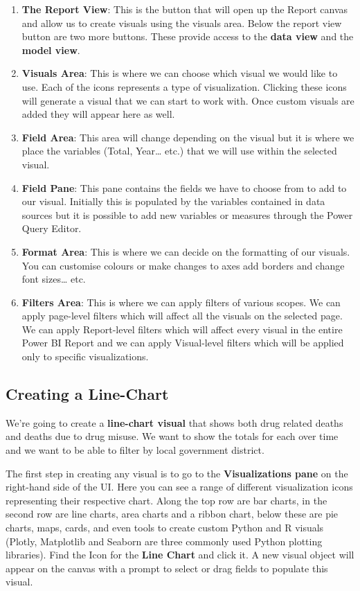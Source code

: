 \documentclass[
]{book}
\begin{document}
\begin{enumerate}
\def\labelenumi{\arabic{enumi}.}
\item
  \textbf{The Report View}: This is the button that will open up the Report canvas and allow us to create visuals using the visuals area. Below the report view button are two more buttons. These provide access to the \textbf{data view} and the \textbf{model view}.
\item
  \textbf{Visuals Area}: This is where we can choose which visual we would like to use. Each of the icons represents a type of visualization. Clicking these icons will generate a visual that we can start to work with. Once custom visuals are added they will appear here as well.
\item
  \textbf{Field Area}: This area will change depending on the visual but it is where we place the variables (Total, Year\ldots{} etc.) that we will use within the selected visual.
\item
  \textbf{Field Pane}: This pane contains the fields we have to choose from to add to our visual. Initially this is populated by the variables contained in data sources but it is possible to add new variables or measures through the Power Query Editor.
\item
  \textbf{Format Area}: This is where we can decide on the formatting of our visuals. You can customise colours or make changes to axes add borders and change font sizes\ldots{} etc.
\item
  \textbf{Filters Area}: This is where we can apply filters of various scopes. We can apply page-level filters which will affect all the visuals on the selected page. We can apply Report-level filters which will affect every visual in the entire Power BI Report and we can apply Visual-level filters which will be applied only to specific visualizations.
\end{enumerate}

\hypertarget{creating-a-line-chart}{%
\subsection{Creating a Line-Chart}\label{creating-a-line-chart}}

We're going to create a \textbf{line-chart visual} that shows both drug related deaths and deaths due to drug misuse. We want to show the totals for each over time and we want to be able to filter by local government district.

The first step in creating any visual is to go to the \textbf{Visualizations pane} on the right-hand side of the UI. Here you can see a range of different visualization icons representing their respective chart. Along the top row are bar charts, in the second row are line charts, area charts and a ribbon chart, below these are pie charts, maps, cards, and even tools to create custom Python and R visuals (Plotly, Matplotlib and Seaborn are three commonly used Python plotting libraries). Find the Icon for the \textbf{Line Chart} and click it. A new visual object will appear on the canvas with a prompt to select or drag fields to populate this visual.
\end{document}
